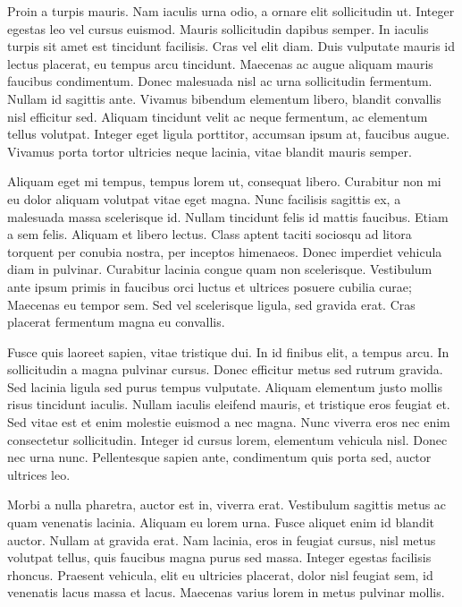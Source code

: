 \documentclass[twoside]{article}
\begin{document}
Proin a turpis mauris. Nam iaculis urna odio, a ornare elit sollicitudin ut. Integer egestas leo vel cursus euismod. Mauris sollicitudin dapibus semper. In iaculis turpis sit amet est tincidunt facilisis. Cras vel elit diam. Duis vulputate mauris id lectus placerat, eu tempus arcu tincidunt. Maecenas ac augue aliquam mauris faucibus condimentum. Donec malesuada nisl ac urna sollicitudin fermentum. Nullam id sagittis ante. Vivamus bibendum elementum libero, blandit convallis nisl efficitur sed. Aliquam tincidunt velit ac neque fermentum, ac elementum tellus volutpat. Integer eget ligula porttitor, accumsan ipsum at, faucibus augue. Vivamus porta tortor ultricies neque lacinia, vitae blandit mauris semper.

Aliquam eget mi tempus, tempus lorem ut, consequat libero. Curabitur non mi eu dolor aliquam volutpat vitae eget magna. Nunc facilisis sagittis ex, a malesuada massa scelerisque id. Nullam tincidunt felis id mattis faucibus. Etiam a sem felis. Aliquam et libero lectus. Class aptent taciti sociosqu ad litora torquent per conubia nostra, per inceptos himenaeos. Donec imperdiet vehicula diam in pulvinar. Curabitur lacinia congue quam non scelerisque. Vestibulum ante ipsum primis in faucibus orci luctus et ultrices posuere cubilia curae; Maecenas eu tempor sem. Sed vel scelerisque ligula, sed gravida erat. Cras placerat fermentum magna eu convallis.

Fusce quis laoreet sapien, vitae tristique dui. In id finibus elit, a tempus arcu. In sollicitudin a magna pulvinar cursus. Donec efficitur metus sed rutrum gravida. Sed lacinia ligula sed purus tempus vulputate. Aliquam elementum justo mollis risus tincidunt iaculis. Nullam iaculis eleifend mauris, et tristique eros feugiat et. Sed vitae est et enim molestie euismod a nec magna. Nunc viverra eros nec enim consectetur sollicitudin. Integer id cursus lorem, elementum vehicula nisl. Donec nec urna nunc. Pellentesque sapien ante, condimentum quis porta sed, auctor ultrices leo.

Morbi a nulla pharetra, auctor est in, viverra erat. Vestibulum sagittis metus ac quam venenatis lacinia. Aliquam eu lorem urna. Fusce aliquet enim id blandit auctor. Nullam at gravida erat. Nam lacinia, eros in feugiat cursus, nisl metus volutpat tellus, quis faucibus magna purus sed massa. Integer egestas facilisis rhoncus. Praesent vehicula, elit eu ultricies placerat, dolor nisl feugiat sem, id venenatis lacus massa et lacus. Maecenas varius lorem in metus pulvinar mollis.
\end{document}
